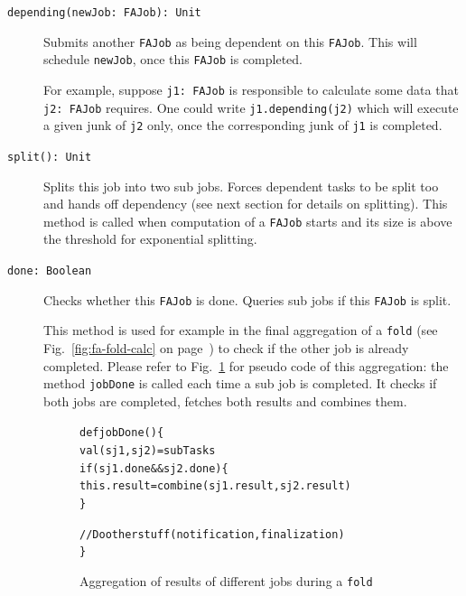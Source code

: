 \documentclass[runningheads,a4paper,fleqn]{llncs}
\begin{document}
\begin{description}
  \item[\texttt{depending(newJob: FAJob): Unit}] Submits another \texttt{FAJob} as being
    dependent on this \texttt{FAJob}. This will schedule
    \texttt{newJob}, once this \texttt{FAJob} is completed.

    For example, suppose \texttt{j1: FAJob} is responsible to
    calculate some data that \texttt{j2: FAJob} requires. One
    could write \verb|j1.depending(j2)| which will execute a given
    junk of \texttt{j2} only, once the corresponding junk of
    \texttt{j1} is completed.
  \item[\texttt{split(): Unit}] Splits this job into two
    sub jobs. Forces dependent tasks to be split too and hands off
    dependency (see next section for details on splitting). This
    method is called when computation of a \texttt{FAJob} starts and
    its size is above the threshold for exponential splitting.
  \item[\texttt{done: Boolean}] Checks whether this \texttt{FAJob} is
    done. Queries sub jobs if this \texttt{FAJob} is split.

    This method is used for example in the final aggregation of a 
    \texttt{fold} (see Fig.~\ref{fig:fa-fold-calc} on
    page~\pageref{fig:fa-fold-calc}) to check if the other job is
    already completed. Please refer to Fig.~\ref{fig:fa-fold-code} for
    pseudo code of this aggregation: the method \texttt{jobDone} is
    called each time a sub job is completed. It checks if both jobs
    are completed, fetches both results and combines them.

\begin{figure}    
\begin{alltt}
{\scriptsize
def jobDone() \{
  val (sj1, sj2) = subTasks
  if (sj1.done && sj2.done) \{
    this.result = combine(sj1.result, sj2.result)
  \}
  
  // Do other stuff (notification, finalization)
\}
}
\end{alltt}
\caption{Aggregation of results of different jobs during a
  \texttt{fold}}
\label{fig:fa-fold-code}
\end{figure}


\end{description}
\end{document}
